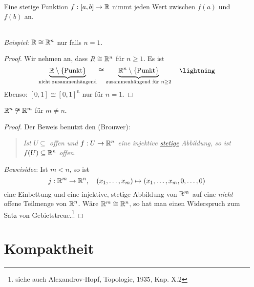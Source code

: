 \begin{corollary}[Zwischenwertsatz]
  Eine \hyperref[def:stetig]{stetige Funktion} $ f: [a,b] \to \mathbb{R} $ nimmt jeden Wert zwischen $ f(a) $ und $ f(b) $ an.
\end{corollary}

\begin{remark}
  \ \\ \emph{Beispiel}: $ \mathbb{R} \cong \mathbb{R}^n $ nur falls $ n = 1 $.
  \begin{proof}
    Wir nehmen an, dass $ R \cong \mathbb{R}^n $ für $ n \geq 1 $. Es ist
    \begin{equation*}
      \underbrace{\R \setminus \{ \text{Punkt} \}}_{\text{nicht zusammenhängend}} \cong \underbrace{\R^n \setminus \{ \text{Punkt} \} }_{\text{zusammenhängend für } n \geq 2} \quad \lightning
    \end{equation*}
    Ebenso: $ [0,1] \cong [0,1]^n $ nur für $ n = 1 $.
  \end{proof}
\end{remark}

\begin{theorem}
  $ \mathbb{R}^n \not \cong \mathbb{R}^m $ für $ m \neq n $.
  \begin{proof}
    Der Beweis benutzt den \label{th:satzGebietstreue} (Brouwer):
    \begin{quote}
      \emph{Ist $ U \subseteq $ offen und $ f: U \to \mathbb{R}^n $ eine injektive \hyperref[def:stetig]{stetige} Abbildung, so ist $ f(U) \subseteq \mathbb{R}^n $ offen.}
    \end{quote}
    \emph{Beweisidee}: Ist $ m < n $, so ist
    \begin{equation*}
      j: \mathbb{R}^m \to \mathbb{R}^n, \quad (x_1, \dots, x_m) \mapsto (x_1, \dots, x_m, 0, \dots, 0)
    \end{equation*}
    eine Einbettung und eine injektive, stetige Abbildung von $ \mathbb{R}^m $ auf eine \emph{nicht} offene Teilmenge von $ \mathbb{R}^n $. Wäre $ \mathbb{R}^m \cong \mathbb{R}^n $, so hat man einen Widerspruch zum Satz von Gebietstreue.\footnote{siehe auch Alexandrov-Hopf, Topologie, 1935, Kap. X.2}
  \end{proof}
\end{theorem}

\section{Kompaktheit}

